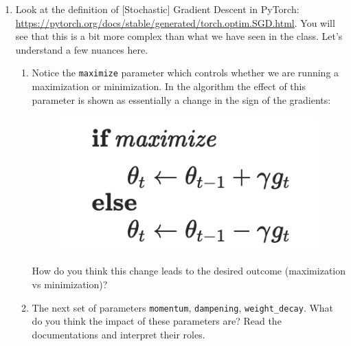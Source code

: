 \begin{enumerate}
    \item Look at the definition of [Stochastic] Gradient Descent in PyTorch: \url{https://pytorch.org/docs/stable/generated/torch.optim.SGD.html}. 
    You will see that this is a bit more complex than what we have seen in the class. Let's understand a few nuances here. 
    \begin{enumerate}
        \item Notice the {\tt maximize} parameter which controls whether we are running a maximization or minimization. 
        In the algorithm the effect of this parameter is shown as essentially a change in the sign of the gradients: 
        \begin{figure}[h]
            \centering
            \includegraphics[scale=0.5]{figures/maximization.png}
        \end{figure}
        How do you think this change leads to the desired outcome (maximization vs minimization)? \\ 
        \item The next set of parameters  {\tt momentum}, {\tt dampening}, {\tt weight\_decay}. What do you think the impact of these parameters are? Read the documentations and interpret their roles. \\

\end{enumerate}
\end{enumerate}
